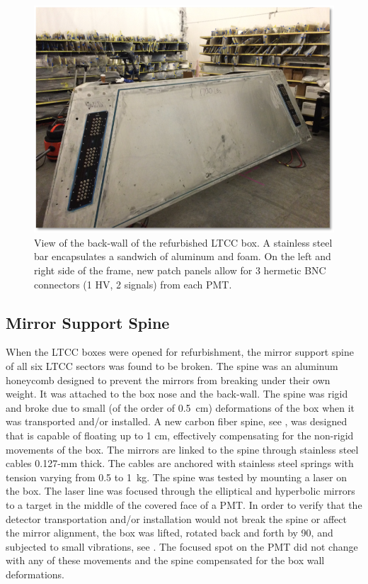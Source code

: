 \begin{figure}
	\centering
	\includegraphics[width=0.99\columnwidth,keepaspectratio]{img/backWall.png}
	\caption{View of the back-wall of the refurbished LTCC box. A stainless steel bar encapsulates a sandwich
             of aluminum and foam. On the left and right side of the frame, new patch panels allow for 3 hermetic
             BNC connectors (1 HV, 2 signals) from each PMT. }
	\label{fig:backWall}
\end{figure}

\subsection{Mirror Support Spine}

When the LTCC boxes were opened for refurbishment, the mirror support spine of all six LTCC sectors was found to be broken.
The spine was an aluminum honeycomb designed to prevent the mirrors from breaking under their own weight.
It was attached to the box nose and the back-wall. The spine was rigid and broke due to small
(of the order of 0.5~cm) deformations of the box when it was transported and/or installed.
A new carbon fiber spine, see , was designed that is capable of floating up to 1 cm, effectively compensating
for the non-rigid movements of the box.
The mirrors are linked to the spine through stainless steel cables 0.127-mm thick.
The cables are anchored with stainless steel springs with tension varying from 0.5 to 1~kg.
The spine was tested by mounting a laser on the box. The laser line was focused through the elliptical
and hyperbolic mirrors to a target in the middle of the covered face of a PMT.
In order to verify that the detector transportation and/or installation would not break the spine
or affect the mirror alignment, the box was lifted, rotated back and forth by 90\mdeg, and subjected
to small vibrations, see . The focused spot on the PMT did not change with any of these movements and
the spine
compensated for the box wall deformations.

